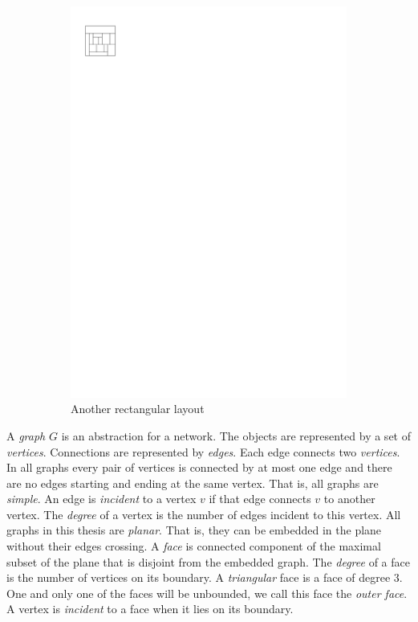 \begin{figure}
\begin{subfigure}[b]{0.45 \textwidth}
        \includegraphics[scale=1]{rectangularDuals/img/vertonesided}
        \caption{Another rectangular layout}
        \label{fig:intr:vertonesided}
      \end{subfigure}
      \caption{}
      \label{fig:intr:graphs}
  \end{figure}

  A \emph{graph} $G$ is an abstraction for a network. The objects are represented by a set of \emph{vertices}. Connections are represented by \emph{edges}. Each edge connects two \emph{vertices}. In all graphs every pair of vertices is connected by at most one edge and there are no edges starting and ending at the same vertex. That is, all graphs are \emph{simple}. An edge is \emph{incident} to a vertex $v$ if that edge connects $v$ to another vertex. The \emph{degree} of a vertex is the number of edges incident to this vertex.
  All graphs in this thesis are \emph{planar}. That is, they can be embedded in the plane without their edges crossing. A \emph{face} is connected component of the maximal subset of the plane that is disjoint from the embedded graph. The \emph{degree} of a face is the number of vertices on its boundary. A \emph{triangular} face is a face of degree $3$. One and only one of the faces will be unbounded, we call this face the \emph{outer face}.
  A vertex is \emph{incident} to a face when it lies on its boundary.

